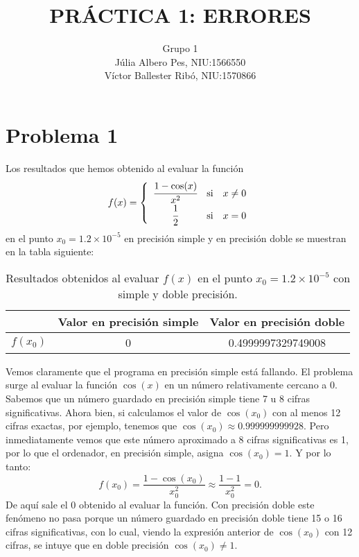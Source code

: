 \documentclass[a4paper]{article}
\title{\bfseries\Large PRÁCTICA 1: ERRORES}
\author{Grupo 1\\Júlia Albero Pes, NIU:1566550\\Víctor Ballester Ribó, NIU:1570866}
\date{\parbox{\linewidth}{\centering
  Métodos numéricos\endgraf
  Grado en Matemáticas\endgraf
  Universitat Autònoma de Barcelona\endgraf
  15 de Marzo de 2021}}
\begin{document}
\maketitle
\thispagestyle{empty}
\newpage
\setcounter{page}{1}
\restoregeometry
\section*{Problema 1}
Los resultados que hemos obtenido al evaluar la función \begin{equation}
    f(x)=\left\{\begin{array}{ccc}
        \cfrac{1-\cos(x)}{x^2} & \text{si} & x\ne 0 \\
        \cfrac{1}{2} & \text{si} & x=0 
    \end{array}\right.
    \label{f}
\end{equation} en el punto $x_0=1.2\times10^{-5}$ en precisión simple y en precisión doble se muestran en la tabla siguiente:\par
\begin{table}[ht]
    \centering
    \begin{tabular}{|c|c|c|}
        \hline
         & Valor en precisión simple & Valor en precisión doble \\
         \hline
         $f(x_0)$ & 0 & 0.4999997329749008 \\
         \hline
    \end{tabular}
    \caption{Resultados obtenidos al evaluar $f(x)$ en el punto $x_0=1.2\times10^{-5}$ con simple y doble precisión.}
    \label{tab:1}
\end{table}
Vemos claramente que el programa en precisión simple está fallando. El problema surge al evaluar la función $\cos(x)$ en un número relativamente cercano a 0. Sabemos que un número guardado en precisión simple tiene 7 u 8 cifras significativas. Ahora bien, si calculamos el valor de $\cos(x_0)$ con al menos 12 cifras exactas, por ejemplo, tenemos que $\cos(x_0)\approx 0.999999999928$. Pero inmediatamente vemos que este número aproximado a 8 cifras significativas es 1, por lo que el ordenador, en precisión simple, asigna $\cos(x_0)=1$. Y por lo tanto: 
\begin{equation*}
    f(x_0)=\frac{1-\cos(x_0)}{x_0^2}\approx\frac{1-1}{x_0^2}=0.
\end{equation*}
De aquí sale el 0 obtenido al evaluar la función. Con precisión doble este fenómeno no pasa porque un número guardado en precisión doble tiene 15 o 16 cifras significativas, con lo cual, viendo la expresión anterior de $\cos(x_0)$ con 12 cifras, se intuye que en doble precisión $\cos(x_0)\ne 1$.\par
\end{document}
